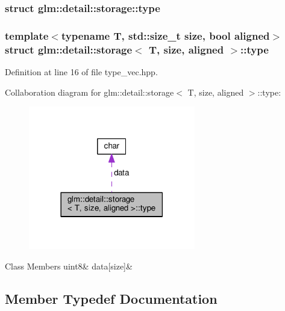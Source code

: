 \subsubsection{struct glm\+:\+:detail\+:\+:storage\+:\+:type}
\subsubsection*{template$<$typename T, std\+::size\+\_\+t size, bool aligned$>$\newline
struct glm\+::detail\+::storage$<$ T, size, aligned $>$\+::type}



Definition at line 16 of file type\+\_\+vec.\+hpp.



Collaboration diagram for glm\+:\+:detail\+:\+:storage$<$ T, size, aligned $>$\+:\+:type\+:
\nopagebreak
\begin{figure}[H]
\begin{center}
\leavevmode
\includegraphics[width=206pt]{da/d5c/structglm_1_1detail_1_1storage_1_1type__coll__graph}
\end{center}
\end{figure}
\begin{DoxyFields}{Class Members}
\mbox{\label{structglm_1_1detail_1_1storage_ab44756dae5eb9194e4e941c91ce9f257}} 
uint8&
data\mbox{[}size\mbox{]}&
\\
\hline

\end{DoxyFields}


\subsection{Member Typedef Documentation}
\mbox{\label{structglm_1_1detail_1_1storage_a11188a4949646a1c74aea5181fc8213d}} 
